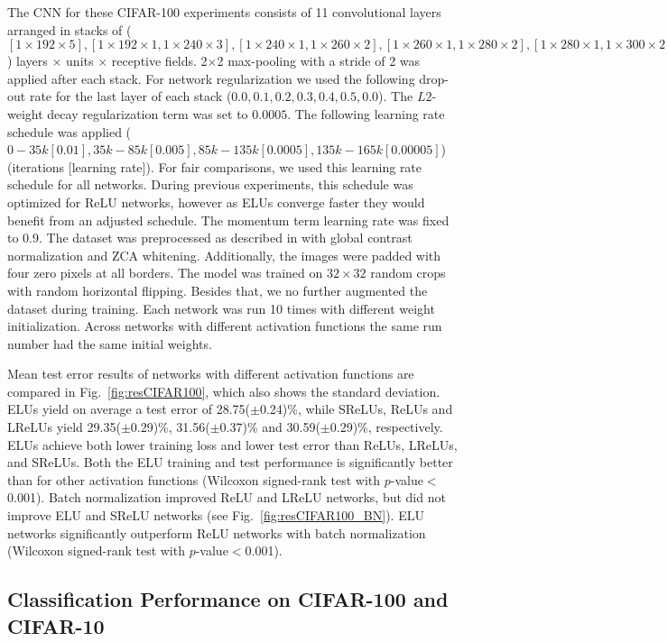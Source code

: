 \documentclass{article}
\begin{document}
The CNN for these CIFAR-100
experiments consists of 11 convolutional layers arranged in stacks of
($[1\times192\times5], [1\times192\times1, 1\times240\times3],
[1\times240\times1, 1\times260\times2], [1\times260\times1,1\times280\times2],
[1\times280\times1,1\times300\times2], [1\times300\times1],
[1\times100\times1]$)
layers $\times$ units $\times$ receptive fields.
2$\times$2 max-pooling with a stride of 2 was applied after each
stack.  For network regularization we used the following drop-out rate
for the last layer of each stack ($0.0, 0.1, 0.2, 0.3, 0.4, 0.5,
0.0$). The $L2$-weight decay regularization term was set to $0.0005$.
The following learning rate schedule was applied ($0-35k [0.01],
35k-85k [0.005], 85k-135k [0.0005], 135k-165k [0.00005]$) (iterations [learning rate]).
For fair comparisons, we used this
learning rate schedule for all networks.
During previous experiments, this schedule was
optimized for ReLU networks, however as ELUs converge faster they
would benefit from an adjusted schedule.
The momentum term learning rate was fixed to 0.9.
The dataset was preprocessed as described in \citet{Goodfellow:13}
with global contrast normalization and ZCA whitening.
Additionally, the images were padded with
four zero pixels at all borders.
The model was trained on $32\times32$ random crops with random
horizontal flipping.
Besides that, we no further augmented the dataset during training.
Each network was run 10 times with different weight initialization.
Across networks with different activation functions the same run number
had the same initial weights.

Mean test error results of networks with different activation functions
are compared in Fig.~\ref{fig:resCIFAR100}, which also shows the standard
deviation.
ELUs yield on average a test error of 28.75($\pm$0.24)\%,
while SReLUs, ReLUs and LReLUs yield 29.35($\pm$0.29)\%,
31.56($\pm$0.37)\% and 30.59($\pm$0.29)\%, respectively.
ELUs achieve both lower training loss and lower test error than ReLUs,
LReLUs, and SReLUs.
Both the ELU training and test performance is significantly better than for other
activation functions (Wilcoxon signed-rank test with $p$-value$<$0.001).
Batch normalization improved ReLU and LReLU networks, but did not improve ELU and SReLU networks (see Fig.~\ref{fig:resCIFAR100_BN}).
ELU networks significantly outperform ReLU networks with batch
normalization (Wilcoxon signed-rank test with $p$-value$<$0.001).


\subsection{Classification Performance on CIFAR-100 and CIFAR-10}
\label{sec:CIFAR100_10}
\end{document}

